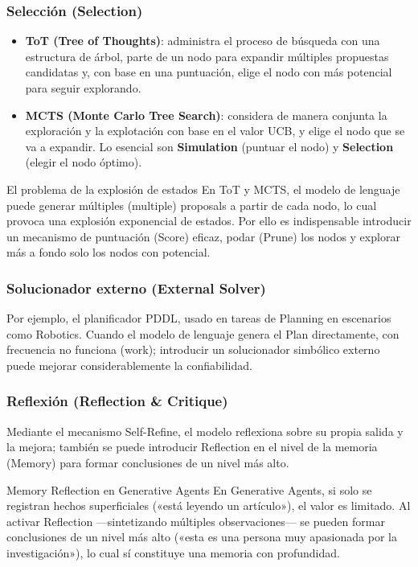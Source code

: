\subsubsection{Selección (Selection)}

\begin{itemize}
    \item \textbf{ToT (Tree of Thoughts)}: administra el proceso de búsqueda con una estructura de árbol, parte de un nodo para expandir múltiples propuestas candidatas y, con base en una puntuación, elige el nodo con más potencial para seguir explorando.
    \item \textbf{MCTS (Monte Carlo Tree Search)}: considera de manera conjunta la exploración y la explotación con base en el valor UCB, y elige el nodo que se va a expandir. Lo esencial son \textbf{Simulation} (puntuar el nodo) y \textbf{Selection} (elegir el nodo óptimo).
\end{itemize}

\begin{warningbox}{El problema de la explosión de estados}
En ToT y MCTS, el modelo de lenguaje puede generar múltiples (multiple) proposals a partir de cada nodo, lo cual provoca una explosión exponencial de estados. Por ello es indispensable introducir un mecanismo de puntuación (Score) eficaz, podar (Prune) los nodos y explorar más a fondo solo los nodos con potencial.
\end{warningbox}

\subsubsection{Solucionador externo (External Solver)}

Por ejemplo, el planificador PDDL, usado en tareas de Planning en escenarios como Robotics. Cuando el modelo de lenguaje genera el Plan directamente, con frecuencia no funciona (work); introducir un solucionador simbólico externo puede mejorar considerablemente la confiabilidad.

\subsubsection{Reflexión (Reflection \& Critique)}

Mediante el mecanismo Self-Refine, el modelo reflexiona sobre su propia salida y la mejora; también se puede introducir Reflection en el nivel de la memoria (Memory) para formar conclusiones de un nivel más alto.

\begin{knowledgebox}{Memory Reflection en Generative Agents}
En Generative Agents, si solo se registran hechos superficiales («está leyendo un artículo»), el valor es limitado. Al activar Reflection —sintetizando múltiples observaciones— se pueden formar conclusiones de un nivel más alto («esta es una persona muy apasionada por la investigación»), lo cual sí constituye una memoria con profundidad.
\end{knowledgebox}

